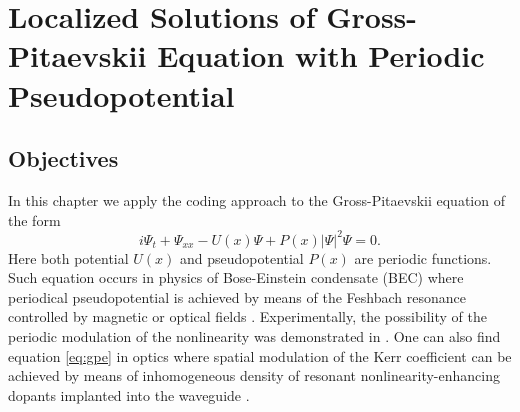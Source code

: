 \chapter{Localized Solutions of Gross-Pitaevskii Equation with Periodic Pseudopotential}

\section{Objectives}

In this chapter we apply the coding approach to the Gross-Pitaevskii equation of the form
\begin{equation}
	i \Psi_t + \Psi_{xx} - U(x) \Psi + P(x) |\Psi|^2 \Psi = 0.
\label{eq:gpe}
\end{equation}
Here both potential $U(x)$ and pseudopotential $P(x)$ are periodic functions.
Such equation occurs in physics of Bose-Einstein condensate (BEC) where periodical pseudopotential is achieved by means of the Feshbach resonance controlled by magnetic or optical fields \cite{PollackDriesJunkerChenCorcovilosHulet, ChinGrimmJulienneTsienga, BauerLetterVoRempeDurr}.
Experimentally, the possibility of the periodic modulation of the nonlinearity was demonstrated in \cite{YamazakiTaieSugawaTakahashi}.
One can also find equation \eqref{eq:gpe} in optics where spatial modulation of the Kerr coefficient can be achieved by means of inhomogeneous density of resonant nonlinearity-enhancing dopants implanted into the waveguide \cite{HukriedeRundeKip}.

